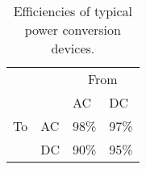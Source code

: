 \begin{table}[h]
\centering
\caption{Efficiencies of typical power conversion devices.}
\label{tab:conv_eff}
\begin{tabular}{ll l l }
	\toprule
	   &                        & \multicolumn{2}{c}{From}                         \\ \cline{3-4}
	   &                        & AC                       & DC                      \\ 
	\midrule
	To & \multicolumn{1}{l}{AC} & 98\% \cite{Starke2008}   & 97\%  \cite{Starke2008} \\
	   & \multicolumn{1}{l}{DC} & 90\% \cite{Pang2006}     & 95\% \cite{Starke2008}  \\

	\bottomrule
\end{tabular}
\end{table}
